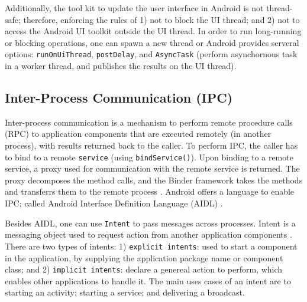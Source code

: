 Additionally, the tool kit to update the user interface in Android is not thread-safe; therefore, enforcing the rules of 1) not to block the UI thread; and 2) not to access the Android UI toolkit outside the UI thread. In order to run long-running or blocking operations, one can spawn a new thread or Android provides serveral options: \verb|runOnUiThread|, \verb|postDelay|, and \verb|AsyncTask| (perform asynchornous task in a worker thread, and publishes the results  on the UI thread). 

\subsection{Inter-Process Communication (IPC)}
Inter-process communication is a mechanism to perform remote procedure calls (RPC) to application components that are executed remotely (in another process), with results returned back to the caller. To perform IPC, the caller has to bind to a remote \verb|service| (using \verb|bindService()|). Upon binding to a remote service, a proxy used for communication with the remote service is returned. The proxy decomposes the method calls, and the Binder framework takes the methods and transferrs them to the remote process \cite{binder}. Android offers a language to enable IPC; called Android Interface Definition Language (AIDL) \cite{aidl}. 

Besides AIDL, one can use \verb|Intent| to pass messages across processes. Intent is a messaging object used to request action from another application components \cite{intents}. There are two types of intents: 1) \verb|explicit intents|: used to start a component in the application, by supplying the application package name or component class; and 2) \verb|implicit intents|: declare a genereal action to perform, which enables other applications to handle it. The main uses cases of an intent are to starting an activity; starting a service; and delivering a broadcast.  

